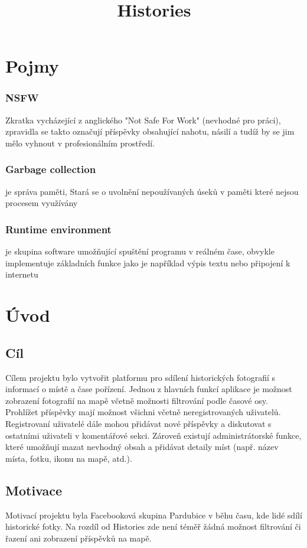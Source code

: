 \documentclass[12pt, a4paper,
 twoside,        %
 openright
]{report}
\title{Histories} %
\author{\name} %
\date{\publicationYear} %
\begin{document}
\pagestyle{empty}



\chapter{Pojmy}
\subsection{NSFW}
Zkratka vycházející z anglického "Not Safe For Work" (nevhodné pro práci), zpravidla se takto označují příspěvky obsahující nahotu, násilí a tudíž by se jim mělo vyhnout v profesionálním prostředí. \cite{NSFW}

\subsection{Garbage collection} je správa paměti, Stará se o uvolnění nepoužívaných úseků v paměti které nejsou procesem využívány \cite{GarbageCollection}

\subsection{Runtime environment} je skupina software umožňující spuštění programu v reálném čase, obvykle implementuje základních funkce jako je například výpis textu nebo připojení k internetu \cite{whatIsRuntimeEnvironment}


\chapter{Úvod}
\section{Cíl}
Cílem projektu bylo vytvořit platformu pro sdílení historických fotografií
s informací o místě a čase pořízení. Jednou z hlavních funkcí aplikace je možnost
zobrazení fotografií na mapě včetně možnosti filtrování podle časové osy. Prohlížet 
příspěvky mají možnost všichni včetně neregistrovaných uživatelů. Registrovaní 
uživatelé dále mohou přidávat nové příspěvky a diskutovat s ostatními uživateli v
komentářové sekci. Zároveň existují administrátorské funkce, které umožňují mazat
nevhodný obsah a přidávat detaily míst (např. název místa, fotku, ikonu na mapě, atd.).

\section{Motivace}
Motivací projektu byla Facebooková skupina Pardubice v běhu času\cite{PardubiceVBehuCasuFB}, kde lidé 
sdílí historické fotky. Na rozdíl od Histories zde není téměř žádná možnost filtrování či 
řazení ani zobrazení příspěvků na mapě.
\end{document}
